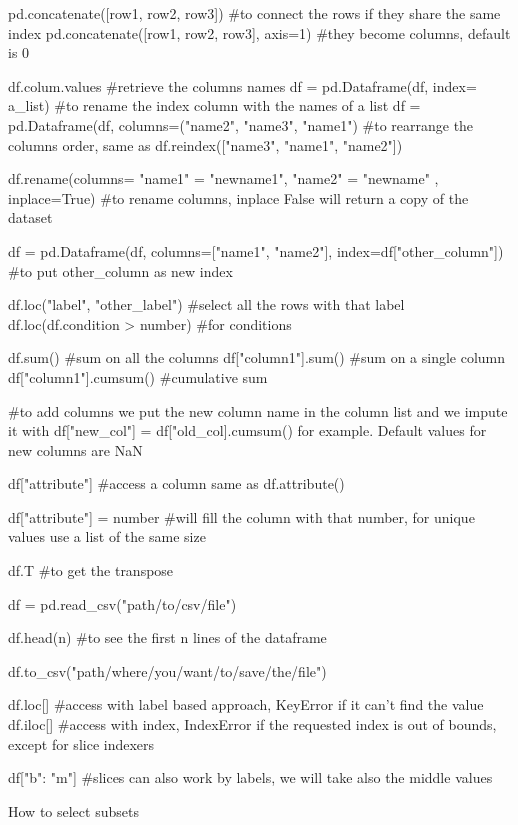 \begin{pythoncode}
    pd.concatenate([row1, row2, row3]) #to connect the rows if they share the same index
    pd.concatenate([row1, row2, row3], axis=1) #they become columns, default is 0

    df.colum.values #retrieve the columns names
    df = pd.Dataframe(df, index= a_list) #to rename the index column with the names of a list
    df = pd.Dataframe(df,
    columns=("name2", "name3", "name1") #to rearrange the columns order, same as df.reindex(["name3", "name1", "name2"])

    df.rename(columns={
    "name1" = "newname1",
    "name2" = "newname"
    }, inplace=True) #to rename columns, inplace False will return a copy of the dataset

    df = pd.Dataframe(df, columns=["name1", "name2"], index=df["other_column"]) #to put other_column as new index

    df.loc("label", "other_label") #select all the rows with that label
    df.loc(df.condition > number) #for conditions

    df.sum() #sum on all the columns
    df["column1"].sum() #sum on a single column
    df["column1"].cumsum() #cumulative sum

    #to add columns we put the new column name in the column list and we impute it with df["new_col"] = df["old_col].cumsum() for example. Default values for new columns are NaN

    df["attribute"] #access a column same as df.attribute()

    df["attribute"] = number #will fill the column with that number, for unique values use a list of the same size

    df.T #to get the transpose

    df = pd.read_csv("path/to/csv/file")

    df.head(n) #to see the first n lines of the dataframe

    df.to_csv("path/where/you/want/to/save/the/file")

    df.loc[] #access with label based approach, KeyError if it can't find the value
    df.iloc[] #access with index, IndexError if the requested index is out of bounds, except for slice indexers

    df["b": "m"] #slices can also work by labels, we will take also the middle values
    
\end{pythoncode}

How to select subsets


